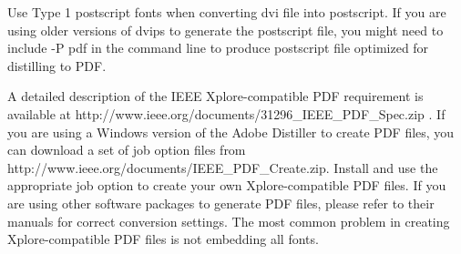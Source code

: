 \documentclass[journal]{IEEEtran}
\begin{document}
Use Type 1 postscript fonts when converting dvi file into postscript.  If you are using older versions of dvips to generate the postscript file, you might need to include -P pdf in the command line to produce postscript file optimized for distilling to PDF.

A detailed description of the IEEE Xplore-compatible PDF requirement is available at http://www.ieee.org/documents/31296\_IEEE\_PDF\_Spec.zip \cite{IEEEPDFRequirement401}.  
If you are using a Windows version of the Adobe Distiller to create PDF files, you can download a set of job option files from http://www.ieee.org/documents/IEEE\_PDF\_Create.zip. Install and use the appropriate job option to create your own Xplore-compatible PDF files.  
If you are using other software packages to generate PDF files, please refer to their manuals for correct conversion settings.  The most common problem in creating Xplore-compatible PDF files is not embedding all fonts.
 


%
%

\end{document}
